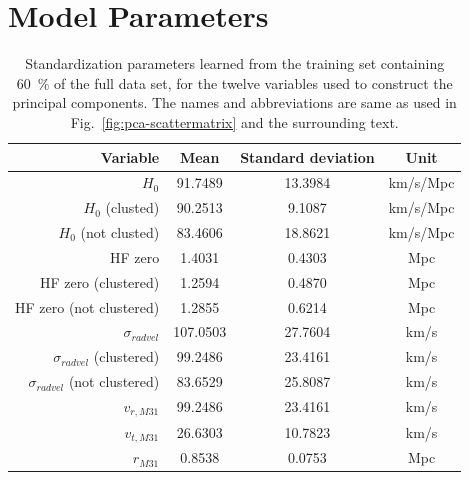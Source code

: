 \documentclass[english, twoside]{HYgradu}
\begin{document}
\chapter{Model Parameters} \label{app:parameters}
\begin{table}[ht]
	\centering
	\begin{tabular}{ r | c c c }
	    	Variable & Mean & Standard deviation & Unit \\
	    	\hline
			$H_0$ & 91.7489 & 13.3984 & km/s/Mpc \\
			$H_0$ (clusted) & 90.2513 & 9.1087 & km/s/Mpc \\
			$H_0$ (not clusted) & 83.4606 & 18.8621 & km/s/Mpc \\
			HF zero & 1.4031 & 0.4303 & Mpc \\
			HF zero (clustered) & 1.2594 & 0.4870 & Mpc \\
			HF zero (not clustered) & 1.2855 & 0.6214 & Mpc \\
			$\sigma_{radvel}$ & 107.0503 & 27.7604 & km/s \\
			$\sigma_{radvel}$ (clustered) & 99.2486 & 23.4161 & km/s \\
			$\sigma_{radvel}$ (not clustered) & 83.6529 & 25.8087 & km/s \\
			$v_{r, M31}$ & 99.2486 & 23.4161 & km/s \\
			$v_{t, M31}$ & 26.6303 & 10.7823 & km/s \\
			$r_{M31}$ & 0.8538 & 0.0753 & Mpc \\
	\end{tabular}
	\caption{Standardization parameters learned from the training set containing 60~\% of the full data set, for the twelve variables used to construct the principal components. The names and abbreviations are same as used in Fig.~\ref{fig:pca-scattermatrix} and the surrounding text.} \label{tab:standardizing}
\end{table}
\end{document}
